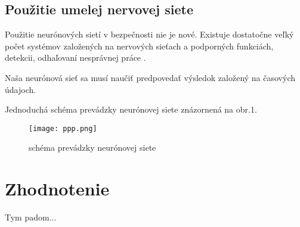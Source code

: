 \documentclass[10pt,twoside,slovak,a4paper]{article}
\begin{document}
\subsection{Použitie umelej nervovej siete} \label{PUNS}

Použitie neurónových sietí v bezpečnosti nie je nové. Existuje dostatočne veľký počet systémov založených na nervových sieťach a podporných funkciách, detekcii, odhaľovaní nesprávnej práce \cite{polupudnikov2018istruments}.

Naša neurónová sieť sa musí naučiť predpovedať výsledok založený na časových údajoch.

Jednoduchá schéma prevádzky neurónovej siete znázornená na obr.1.

\begin{figure}[h]
    \centering
    \texttt{[image: ppp.png]}
    \caption{schéma prevádzky neurónovej siete}
    \label{fig:my_label}
\end{figure}

\section{Zhodnotenie} \label{End}

Tym  padom...




\end{document}
